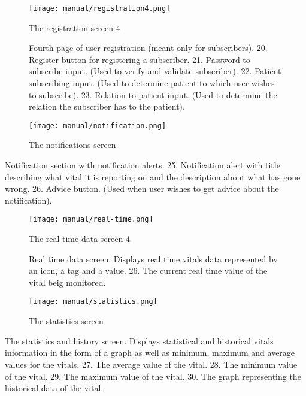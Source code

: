 \begin{figure}[ht!]
\centering
\begin{minipage}{.5\textwidth}
  \centering
  \texttt{[image: manual/registration4.png]}
  \caption{\label{fig:vitals}The registration screen 4}
Fourth page of user registration (meant only for subscribers). 
  20. Register button for registering a subscriber. 
  21. Password to subscribe input. (Used to verify and validate subscriber). 
  22. Patient subscribing input. (Used to determine patient to which user wishes to subscribe). 
  23. Relation to patient input. (Used to determine the relation the subscriber has to the patient). 

\end{minipage}%
\begin{minipage}{.5\textwidth}
  \centering
  \texttt{[image: manual/notification.png]}
  \caption{\label{fig:statistic}The notifications screen}
\end{minipage}
\end{figure}
Notification section with notification alerts. 
  25. Notification alert with title describing what vital it is reporting on and the description about what has gone wrong. 
  26. Advice button. (Used when user wishes to get advice about the notification). 

\begin{figure}[ht!]
\centering
\begin{minipage}{.5\textwidth}
  \centering
  \texttt{[image: manual/real-time.png]}
  \caption{\label{fig:vitals}The real-time data screen 4}
Real time data screen. Displays real time vitals data represented by an icon, a tag and a value. 
  26. The current real time value of the vital beig monitored. 

\end{minipage}%
\begin{minipage}{.5\textwidth}
  \centering
  \texttt{[image: manual/statistics.png]}
  \caption{\label{fig:statistic}The statistics screen}
\end{minipage}
\end{figure}
The statistics and history screen. Displays statistical and historical vitals information in the form of a graph as well as minimum, maximum and average values for the vitals. 
  27. The average value of the vital. 
  28. The minimum value of the vital. 
  29. The maximum value of the vital. 
  30. The graph representing the historical data of the vital. 
